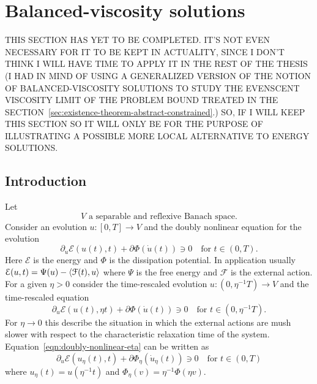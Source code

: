 \section{Balanced-viscosity solutions}

\color{red}
THIS SECTION HAS YET TO BE COMPLETED. IT'S NOT EVEN NECESSARY FOR IT TO BE KEPT IN ACTUALITY, SINCE I DON'T THINK I WILL HAVE TIME TO APPLY IT IN THE REST OF THE THESIS (I HAD IN MIND OF USING A GENERALIZED VERSION OF THE NOTION OF BALANCED-VISCOSITY SOLUTIONS TO STUDY THE EVENSCENT VISCOSITY LIMIT OF THE PROBLEM BOUND TREATED IN THE SECTION~\ref{sec:existence-theorem-abstract-constrained}.) SO, IF I WILL KEEP THIS SECTION SO IT WILL ONLY BE FOR THE PURPOSE OF ILLUSTRATING A POSSIBLE MORE LOCAL ALTERNATIVE TO ENERGY SOLUTIONS.
\color{black}

\subsection{Introduction}
Let
\begin{equation}
\label{eqn:bv-space}
\text{$V$ a separable and reflexive Banach space}.
\tag{$V$}
\end{equation}
Consider an evolution $u\colon[0,T]\to V$ and the doubly nonlinear equation for the evolution
\begin{equation}
\label{eqn:doubly-nonlinear}
\partial_u\mathcal{E}(u(t),t)+\partial\Phi(\dot u(t))\ni0\quad\text{for $t\in(0,T)$}.
\end{equation}
Here $\mathcal{E}$ is the energy and $\Phi$ is the dissipation potential. In application usually $\mathcal{E}(u,t)=\Psi(u)-\langle\mathcal F(t),u\rangle$ where $\Psi$ is the free energy and $\mathcal{F}$ is the external action. For a given $\eta>0$ consider the time-rescaled evolution $u\colon(0,\eta^{-1}T)\to V$ and the time-rescaled equation
\begin{equation}
\label{eqn:doubly-nonlinear-eta}
\partial_u\mathcal{E}(u(t),\eta t)+\partial\Phi(\dot u(t))\ni0\quad\text{for $t\in(0,\eta^{-1}T)$}.
\end{equation}
For $\eta\to0$ this describe the situation in which the external actions are mush slower with respect to the characteristic relaxation time of the system. Equation~\eqref{eqn:doubly-nonlinear-eta} can be written as
\begin{equation}
\label{eqn:doubly-nonlinear-rescaled}
\partial_u\mathcal{E}(u_\eta(t),t)+\partial\Phi_\eta(\dot u_\eta(t))\ni0\quad\text{for $t\in(0,T)$}
\end{equation}
where $u_\eta(t)=u(\eta^{-1}t)$ and $\Phi_\eta(v)=\eta^{-1}\Phi(\eta v)$.

